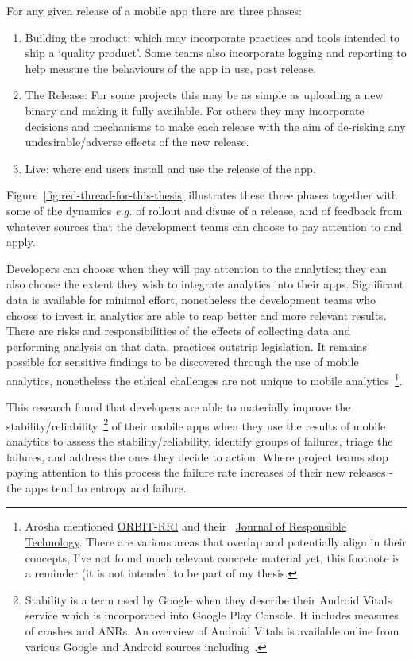 For any given release of a mobile app there are three phases:
\begin{enumerate}
    \item Building the product: which may incorporate practices and tools intended to ship a `quality product'. Some teams also incorporate logging and reporting to help measure the behaviours of the app in use, post release.
    \item The Release: For some projects this may be as simple as uploading a new binary and making it fully available. For others they may incorporate decisions and mechanisms to make each release with the aim of de-risking any undesirable/adverse effects of the new release.
    \item Live: where end users install and use the release of the app.
\end{enumerate}

Figure~\ref{fig:red-thread-for-this-thesis} illustrates these three phases together with some of the dynamics \emph{e.g.} of rollout and disuse of a release, and of feedback from whatever sources that the development teams can choose to pay attention to and apply.

Developers can choose when they will pay attention to the analytics; they can also choose the extent they wish to integrate analytics into their apps. Significant data is available for minimal effort, nonetheless the development teams who choose to invest in analytics are able to reap better and more relevant results. There are risks and responsibilities of the effects of collecting data and performing analysis on that data, practices outstrip legislation. It remains possible for sensitive findings to be discovered through the use of mobile analytics, nonetheless the ethical challenges are not unique to mobile analytics~\footnote{Arosha mentioned \href{https://www.orbit-rri.org/}{ORBIT-RRI} and their ~\href{https://www.journals.elsevier.com/journal-of-responsible-technology}{Journal of Responsible Technology}. There are various areas that overlap and potentially align in their concepts, I've not found much relevant concrete material yet, this footnote is a reminder (it is not intended to be part of my thesis.}.

This research found that developers are able to materially improve the stability/reliability~\footnote{Stability is a term used by Google when they describe their Android Vitals service which is incorporated into Google Play Console. It includes measures of crashes and ANRs. An overview of Android Vitals is available online from various Google and Android sources including~\citep{android_vitals_overview_2019, android_vitals_best_practices}.}
%
of their mobile apps when they use the results of mobile analytics to assess the stability/reliability, identify groups of failures, triage the failures, and address the ones they decide to action. Where project teams stop paying attention to this process the failure rate increases of their new releases - the apps tend to entropy and failure.

